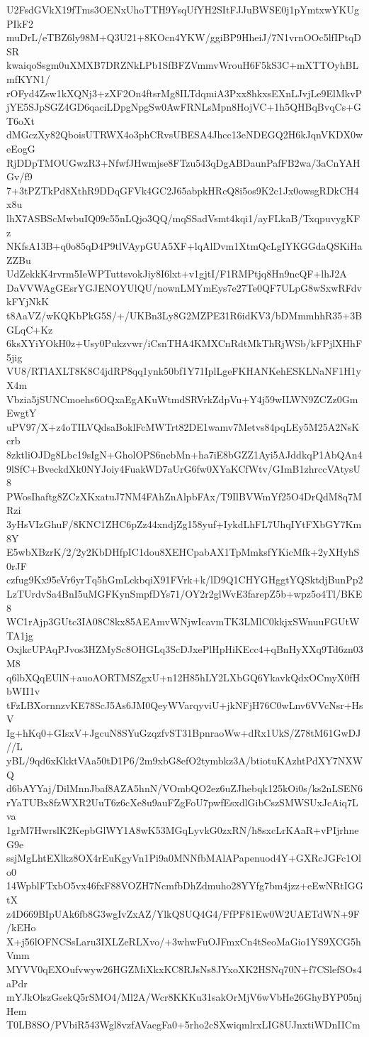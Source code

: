 U2FsdGVkX19fTms3OENxUhoTTH9YsqUfYH2SItFJJuBWSE0j1pYmtxwYKUgPIkF2
muDrL/eTBZ6ly98M+Q3U21+8KOcn4YKW/ggiBP9HheiJ/7N1vrnOOc5lfIPtqDSR
kwaiqoSsgm0uXMXB7DRZNkLPb1SfBFZVmmvWrouH6F5kS3C+mXTTOyhBLmfKYN1/
rOFyd4Zsw1kXQNj3+zXF2On4ftsrMg8ILTdqmiA3Pxx8hkxsEXnLJvjLe9ElMkvP
jYE5SJpSGZ4GD6qaciLDpgNpgSw0AwFRNLsMpn8HojVC+1h5QHBqBvqCs+GT6oXt
dMGczXy82QboisUTRWX4o3phCRvsUBESA4Jhcc13eNDEGQ2H6kJqnVKDX0weEogG
RjDDpTMOUGwzR3+NfwfJHwmjse8FTzu543qDgABDaunPafFB2wa/3aCnYAHGv/f9
7+3tPZTkPd8XthR9DDqGFVk4GC2J65abpkHRcQ8i5os9K2c1Jx0owsgRDkCH4x8u
lhX7ASBScMwbuIQ09c55nLQjo3QQ/mqSSadVsmt4kqi1/ayFLkaB/TxqpuvygKFz
NKfsA13B+q0o85qD4P9tlVAypGUA5XF+lqAlDvm1XtmQcLgIYKGGdaQSKiHaZZBu
UdZekkK4rvrm5IeWPTuttsvokJiy8I6lxt+v1gjtI/F1RMPtjq8Hn9ncQF+lhJ2A
DaVVWAgGEsrYGJENOYUlQU/nownLMYmEys7e27Te0QF7ULpG8wSxwRFdvkFYjNkK
t8AaVZ/wKQKbPkG5S/+/UKBn3Ly8G2MZPE31R6idKV3/bDMmmhhR35+3BGLqC+Kz
6ksXYiYOkH0z+Usy0Pukzvwr/iCsnTHA4KMXCnRdtMkThRjWSb/kFPjlXHhF5jig
VU8/RTlAXLT8K8C4jdRP8qq1ynk50bf1Y71IplLgeFKHANKehESKLNaNF1H1yX4m
Vbzia5jSUNCmoehs6OQxaEgAKuWtmdSRVrkZdpVu+Y4j59wILWN9ZCZz0GmEwgtY
uPV97/X+z4oTILVQdsaBoklFcMWTrt82DE1wamv7Metvs84pqLEy5M25A2NsKcrb
8zktliOJDg8Lbc19sIgN+GholOPS6nebMn+ha7iE8bGZZ1Ayi5AJddkqP1AbQAn4
9lSfC+BveckdXk0NYJoiy4FuakWD7aUrG6fw0XYaKCfWtv/GImB1zhrccVAtysU8
PWosIhaftg8ZCzXKxatuJ7NM4FAhZnAlpbFAx/T9IlBVWmYf25O4DrQdM8q7MRzi
3yHsVIzGhuF/8KNC1ZHC6pZz44xndjZg158yuf+IykdLhFL7UhqIYtFXbGY7Km8Y
E5wbXBzrK/2/2y2KbDHfpIC1dou8XEHCpabAX1TpMmksfYKicMfk+2yXHyhS0rJF
czfug9Kx95eVr6yrTq5hGmLckbqiX91FVrk+k/lD9Q1CHYGHggtYQSktdjBunPp2
LzTUrdvSa4BnI5uMGFKynSmpfDYs71/OY2r2glWvE3farepZ5b+wpz5o4Tl/BKE8
WC1rAjp3GUtc3IA08C8kx85AEAmvWNjwIcavmTK3LMlC0kkjxSWnuuFGUtWTA1jg
OxjkcUPAqPJvos3HZMySc8OHGLq3ScDJxePlHpHiKEcc4+qBnHyXXq9Td6zn03M8
q6lbXQqEUlN+auoAORTMSZgxU+n12H85hLY2LXbGQ6YkavkQdxOCmyX0fHbWII1v
tFzLBXornnzvKE78ScJ5As6JM0QeyWVarqyviU+jkNFjH76C0wLnv6VVcNsr+HsV
Ig+hKq0+GIsxV+JgcuN8SYuGzqzfvST31BpnraoWw+dRx1UkS/Z78tM61GwDJ//L
yBL/9qd6xKkktVAa50tD1P6/2m9xbG8efO2tymbkz3A/btiotuKAzhtPdXY7NXWQ
d6bAYYaj/DilMnnJbaf8AZA5hnN/VOmbQO2ez6uZJhebqk125kOi0s/ks2nLSEN6
rYaTUBx8fzWXR2UuT6z6cXe8u9auFZgFoU7pwfEsxdlGibCszSMWSUxJcAiq7Lva
1grM7HwrslK2KepbGlWY1A8wK53MGqLyvkG0zxRN/h8sxcLrKAaR+vPIjrhneG9e
ssjMgLhtEXlkz8OX4rEuKgyVn1Pi9a0MNNfbMAlAPapenuod4Y+GXRcJGFc1Olo0
14WpblFTxbO5vx46fxF88VOZH7NcmfbDhZdmuho28YYfg7bm4jzz+eEwNRtIGGtX
z4D669BIpUAk6fb8G3wgIvZxAZ/YlkQSUQ4G4/FfPF81Ew0W2UAETdWN+9F/kEHo
X+j56lOFNCSsLaru3IXLZeRLXvo/+3whwFuOJFmxCn4tSeoMaGio1YS9XCG5hVmm
MYVV0qEXOufvwyw26HGZMiXkxKC8RJsNs8JYxoXK2HSNq70N+f7CSlefSOs4aPdr
mYJkOlszGsekQ5rSMO4/Ml2A/Wcr8KKKu31sakOrMjV6wVbHe26GhyBYP05njHem
T0LB8SO/PVbiR543Wgl8vzfAVaegFa0+5rho2cSXwiqmlrxLIG8UJnxtiWDnIICm
